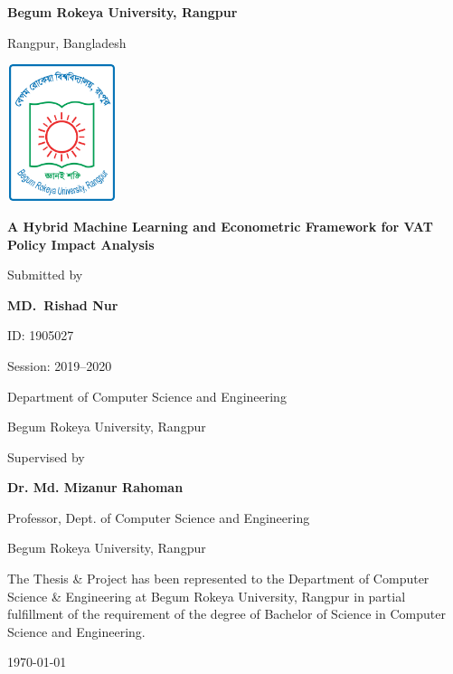 \begin{titlepage}
    \centering
    
    {\LARGE\bfseries Begum Rokeya University, Rangpur\par}
    {\large Rangpur, Bangladesh\par}
    
    \vspace{1cm}
    
    \includegraphics[width=3.2cm,height=4cm]{images/BRUR_Logo.png}
    
    \vspace{1cm}
    
    {\LARGE\bfseries A Hybrid Machine Learning and Econometric Framework for VAT Policy Impact Analysis\par}
    

    \vspace{2cm}
    
    Submitted by\par
    \textbf{MD.\ Rishad Nur}\par
    ID: 1905027\par
    Session: 2019--2020\par
    Department of Computer Science and Engineering\par
    Begum Rokeya University, Rangpur\par

    \vspace{1cm}

    Supervised by\par
    \textbf{Dr. Md. Mizanur Rahoman}\par
    Professor, Dept. of Computer Science and Engineering\par
    Begum Rokeya University, Rangpur\par

    \vspace{3cm}
    
    {\small
    \begin{flushleft}
    The Thesis \& Project has been represented to the Department of Computer Science \& Engineering at Begum Rokeya University, Rangpur in partial fulfillment of the requirement of the degree of Bachelor of Science in Computer Science and Engineering.
    \end{flushleft}
    }

    \vspace{1cm}

    {\large \today\par}
\end{titlepage}


